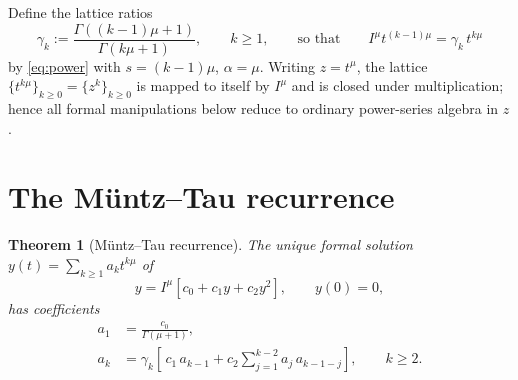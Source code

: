 \documentclass[11pt]{article}
\newtheorem{theorem}{Theorem}[section]
\newcommand{\Imu}{I^{\mu}}
\begin{document}
Define the lattice ratios
\begin{equation}\label{eq:gamma-def}
\gamma_k:=\frac{\Gamma((k-1)\mu+1)}{\Gamma(k\mu+1)},\qquad k\ge1,
\qquad\text{so that}\qquad
\Imu t^{(k-1)\mu}=\gamma_k\,t^{k\mu}
\end{equation}
by \eqref{eq:power} with $s=(k-1)\mu$, $\alpha=\mu$. Writing $z=t^{\mu}$,
the lattice $\{t^{k\mu}\}_{k\ge0}=\{z^k\}_{k\ge0}$ is mapped to itself by
$\Imu$ and is closed under multiplication; hence all formal manipulations
below reduce to ordinary power-series algebra in $z$.

\section{The M\"untz--Tau recurrence}\label{sec:tau}

\begin{theorem}[M\"untz--Tau recurrence]\label{thm:tau}
The unique formal solution $y(t)=\sum_{k\ge1}a_kt^{k\mu}$ of
\begin{equation}\label{eq:tau-ivp}
y=\Imu\!\left[c_0+c_1y+c_2y^2\right],\qquad y(0)=0,
\end{equation}
has coefficients
\begin{align}
a_1&=\frac{c_0}{\Gamma(\mu+1)},\label{eq:a1}\\
a_k&=\gamma_k\!\left[\,c_1\,a_{k-1}+c_2\sum_{j=1}^{k-2}a_j\,a_{k-1-j}\right],
\qquad k\ge2.\label{eq:ak}
\end{align}
\end{theorem}
\end{document}

